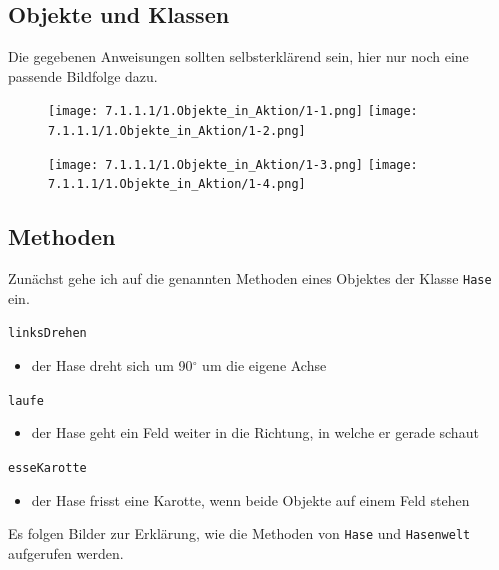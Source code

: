 \documentclass{scrartcl}   %
\begin{document}
\subsection{Objekte und Klassen}
Die gegebenen Anweisungen sollten selbsterklärend sein, hier nur noch eine passende Bildfolge dazu.

\vspace{0.3cm}

\begin{figure}[ht]
	\centering
	\texttt{[image: 7.1.1.1/1.Objekte\_in\_Aktion/1-1.png]}
	\hspace{0.5cm}
	\texttt{[image: 7.1.1.1/1.Objekte\_in\_Aktion/1-2.png]}
\end{figure}

\vspace{0.5cm}

\begin{figure}[ht]
	\centering
	\texttt{[image: 7.1.1.1/1.Objekte\_in\_Aktion/1-3.png]}
	\hspace{0.5cm}
	\texttt{[image: 7.1.1.1/1.Objekte\_in\_Aktion/1-4.png]}
\end{figure}

\subsection{Methoden}
Zunächst gehe ich auf die genannten Methoden eines Objektes der Klasse \texttt{Hase} ein.

\begin{itemize}
    \barrow \texttt{linksDrehen}
    \begin{itemize}
    \item der Hase dreht sich um 90$^{\circ}$ um die eigene Achse
    \end{itemize}
    \barrow \texttt{laufe}
    \begin{itemize}
    \item der Hase geht ein Feld weiter in die Richtung, in welche er gerade schaut
    \end{itemize}
    \barrow \texttt{esseKarotte}
    \begin{itemize}
    \item der Hase frisst eine Karotte, wenn beide Objekte auf einem Feld stehen
    \end{itemize}
\end{itemize}

Es folgen Bilder zur Erklärung, wie die Methoden von \texttt{Hase} und \texttt{Hasenwelt} aufgerufen werden.
\end{document}
